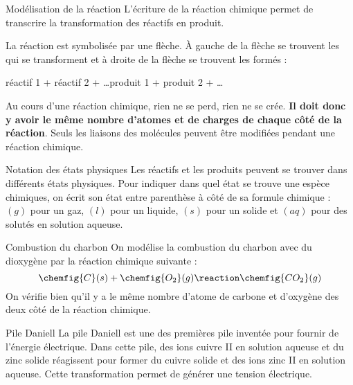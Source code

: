 \begin{doc}{Modélisation de la réaction}
  L'écriture de la réaction chimique permet de transcrire la transformation des réactifs en produit.
  
  \begin{encart}
    La réaction est symbolisée par une flèche. À gauche de la flèche se trouvent les  qui se transforment et à droite de la flèche se trouvent les  formés :
    \begin{center}
      réactif 1 + réactif 2 + \ldots \reaction produit 1 + produit 2 + \ldots
    \end{center}
  \end{encart}
  
  Au cours d'une réaction chimique, rien ne se perd, rien ne se crée. \textbf{Il doit donc y avoir le même nombre d'atomes et de charges de chaque côté de la réaction}.
  Seuls les liaisons des molécules peuvent être modifiées pendant une réaction chimique.
\end{doc}
\begin{doc}{Notation des états physiques}
  Les réactifs et les produits peuvent se trouver dans différents états physiques.
  Pour indiquer dans quel état se trouve une espèce chimiques, on écrit son état entre parenthèse à côté de sa formule chimique : $(g)$ pour un gaz, $(l)$ pour un liquide, $(s)$ pour un solide et $(aq)$ pour des solutés en solution aqueuse.
\end{doc}

\newpage
\vspace*{-40pt}
\begin{doc}{Combustion du charbon}
  On modélise la combustion du charbon avec du dioxygène par la réaction chimique suivante :
  \begin{equation*}
    \chemfig{C}(s) + \chemfig{O_2}(g) \reaction \chemfig{CO_2}(g)
  \end{equation*}
  On vérifie bien qu'il y a le même nombre d'atome de carbone et d'oxygène des deux côté de la réaction chimique.
\end{doc}




\vspace*{-8pt}
\begin{doc}{Pile Daniell}
  La pile Daniell est une des premières pile inventée pour fournir de l'énergie électrique.
  Dans cette pile, des ions cuivre II  en solution aqueuse et du zinc solide  réagissent pour former du cuivre solide  et des ions zinc II  en solution aqueuse.
  Cette transformation permet de générer une tension électrique.
\end{doc}

